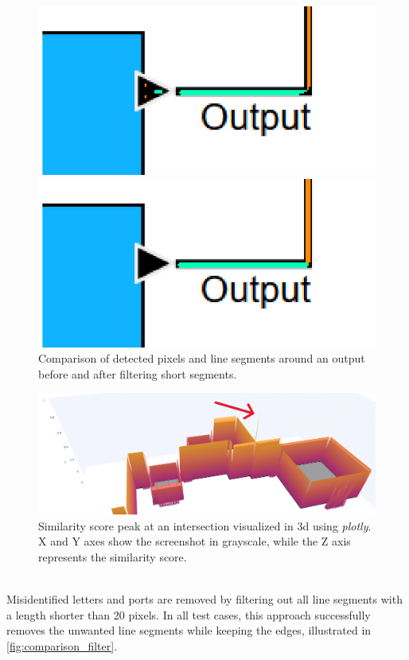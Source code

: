 \begin{figure}[ht]
  \centering
  \begin{minipage}[b]{0.45\textwidth}
    \includegraphics[width=\textwidth]{pictures/thresh_zoom.png}
  \end{minipage}
  \hfill
  \begin{minipage}[b]{0.45\textwidth}
    \includegraphics[width=\textwidth]{pictures/line_segments_zoom.png}
  \end{minipage}
  \caption[Detected pixels / line segments before and after filtering]{Comparison of detected pixels and line segments around an output before and after filtering short segments.}
  \label{fig:comparison_filter}
\end{figure}
\begin{figure}[ht]
    \centering
    \includegraphics[width=1\linewidth]{pictures/intersection_peak.png}
    \caption[Similarity score peak at an intersection]{Similarity score peak at an intersection visualized in 3d using \textit{plotly}. X and Y axes show the screenshot in grayscale, while the Z axis represents the similarity score.}
    \label{fig:intersection_peak}
\end{figure}\\
Misidentified letters and ports are removed by filtering out all line segments with a length shorter than 20 pixels. In all test cases, this approach successfully removes the unwanted line segments while keeping the edges, illustrated in \autoref{fig:comparison_filter}.

